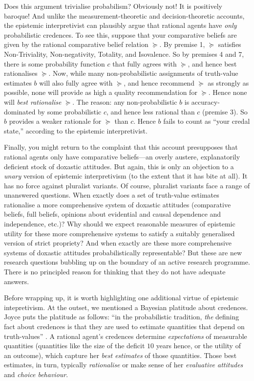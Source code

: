 Does this argument trivialise probabilism? Obviously not! It is positively baroque! And unlike the measurement-theoretic and decision-theoretic accounts, the epistemic interpretivist can plausibly argue that rational agents have \textit{only} probabilistic credences. To see this, suppose that your comparative beliefs are given by the rational comparative belief relation $\succeq$. By premise 1, $\succeq$ satisfies Non-Triviality, Non-negativity, Totality, and Isovalence. So by premises 4 and 7, there is some probability function $c$ that fully agrees with $\succeq$, and hence best rationalises $\succeq$. Now, while many non-probabilistic assignments of truth-value estimates $b$ will also fully agree with $\succeq$, and hence recommend $\succeq$ as strongly as possible, none will provide as high a quality recommendation for $\succeq$. Hence none will \textit{best rationalise} $\succeq$. The reason: any non-probabilistic $b$ is accuracy-dominated by some probabilistic $c$, and hence less rational than $c$ (premise 3). So $b$ provides a weaker rationale for $\succeq$ than $c$. Hence $b$ fails to count as ``your credal state,'' according to the epistemic interpretivist.

Finally, you might return to the complaint that this account presupposes that rational agents only have comparative beliefs---an overly austere, explanatorily deficient stock of doxastic attitudes. But again, this is only an objection to a \textit{unary} version of epistemic interpretivism (to the extent that it has bite at all). It has no force against pluralist variants. Of course, pluralist variants face a range of unanswered questions. When exactly does a set of truth-value estimates rationalise a more comprehensive system of doxastic attitudes (comparative beliefs, full beliefs, opinions about evidential and causal dependence and independence, etc.)? Why should we expect reasonable measures of epistemic utility for these more comprehensive systems to satisfy a suitably generalised version of strict propriety? And when exactly are these more comprehensive systems of doxastic attitudes probabilistically representable? But these are new research questions bubbling up on the boundary of an active research programme. There is no principled reason for thinking that they do not have adequate answers.

Before wrapping up, it is worth highlighting one additional virtue of epistemic intepretivism. At the outset, we mentioned a Bayesian platitude about credences. Joyce puts the platitude as follows: ``in the probabilistic tradition, \textit{the} defining fact about credences is that they are used to estimate quantities that depend on truth-values'' \citep[pp. 268--9]{Joyce2009}. A rational agent's credences determine \textit{expectations} of measurable quantities (quantities like the size of the deficit $10$ years hence, or the utility of an outcome), which capture her \textit{best estimates} of those quantities. Those best estimates, in turn, typically \textit{rationalise} or make sense of her \textit{evaluative attitudes} and \textit{choice behaviour}.

